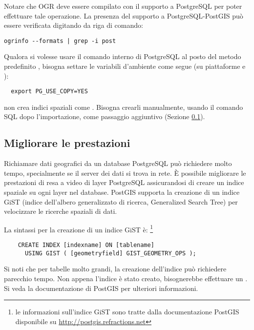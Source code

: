 Notare che OGR deve essere compilato con il supporto a PostgreSQL per poter
effettuare tale operazione.
La presenza del supporto a PostgreSQL-PostGIS può essere verificata digitando
da riga di comando:
\begin{verbatim}
ogrinfo --formats | grep -i post
\end{verbatim}

Qualora si volesse usare il comando interno di PostgreSQL  al posto
del metodo predefinito , bisogna settare le variabili
d'ambiente come segue (su piattaforme \nix e \osx):
\begin{verbatim}
  export PG_USE_COPY=YES
\end{verbatim}

 non crea indici spaziali come . Bisogna
crearli manualmente, usando il comando SQL  dopo
l'importazione, come passaggio aggiuntivo (Sezione \ref{label_improve}).

\subsection{Migliorare le prestazioni} \label{label_improve}

Richiamare dati geografici da un database PostgreSQL può richiedere molto
tempo, specialmente se il server dei dati si trova in rete. È possibile
migliorare le prestazioni di resa a video di layer PostgreSQL assicurandosi
di creare un  indice spaziale su ogni layer nel
database. PostGIS supporta la creazione di un  indice GiST
(indice dell'albero generalizzato di ricerca, Generalized Search Tree) per
velocizzare le ricerche spaziali di dati.

La sintassi per la creazione di un indice GiST è:
\footnote{le informazioni sull'indice GiST
sono tratte dalla documentazione PostGIS disponibile su \url{http://postgis.refractions.net}}

\begin{verbatim}
    CREATE INDEX [indexname] ON [tablename] 
      USING GIST ( [geometryfield] GIST_GEOMETRY_OPS );
\end{verbatim}

Si noti che per tabelle molto grandi, la creazione dell'indice può richiedere
parecchio tempo. Non appena l'indice è stato creato, bisognerebbe effettuare
un . Si veda la documentazione di PostGIS
\cite{PostGISweb} per ulteriori informazioni.

